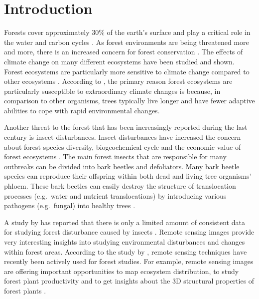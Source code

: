 \documentclass[a4paper, twoside]{templates/ociamthesis}
\begin{document}
\flushbottom

\hypertarget{introduction}{%
\chapter{Introduction}\label{introduction}}

Forests cover approximately 30\% of the earth's surface and play a critical role in the water and carbon cycles \citep{laurent2011inversion}. As forest environments are being threatened more and more, there is an increased concern for forest conservation \citep{grammatikopoulou2021value}. The effects of climate change on many different ecosystems have been studied and shown. Forest ecosystems are particularly more sensitive to climate change compared to other ecosystems \citep{esquivel2019compositional, lindner2010climate}. According to \citet{lindner2010climate}, the primary reason forest ecosystems are particularly susceptible to extraordinary climate changes is because, in comparison to other organisms, trees typically live longer and have fewer adaptive abilities to cope with rapid environmental changes.

Another threat to the forest that has been increasingly reported during the last century is insect disturbances. Insect disturbances have increased the concern about forest species diversity, biogeochemical cycle and the economic value of forest ecosystems \citep{senf2017remote}. The main forest insects that are responsible for many outbreaks can be divided into bark beetles and defoliators. Many bark beetle species can reproduce their offspring within both dead and living tree organisms' phloem. These bark beetles can easily destroy the structure of translocation processes (e.g.~water and nutrient translocations) by introducing various pathogens (e.g.~fungal) into healthy trees \citep{senf2017remote}.

A study by \citet{kautz2017biotic} has reported that there is only a limited amount of consistent data for studying forest disturbance caused by insects \citep{senf2017remote}. Remote sensing images provide very interesting insights into studying environmental disturbances and changes within forest areas. According to the study by \citet{lechner2020applications}, remote sensing techniques have recently been actively used for forest studies. For example, remote sensing images are offering important opportunities to map ecosystem distribution, to study forest plant productivity and to get insights about the 3D structural properties of forest plants \citep{lechner2020applications}.
\end{document}
